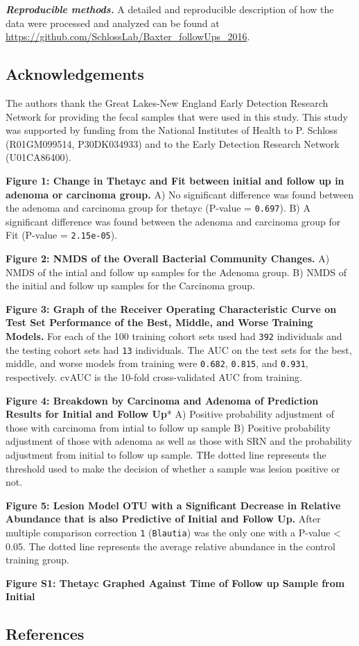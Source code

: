 \documentclass[12pt,]{article}
\begin{document}
\textbf{\emph{Reproducible methods.}} A detailed and reproducible
description of how the data were processed and analyzed can be found at
\url{https://github.com/SchlossLab/Baxter_followUps_2016}.

\newpage

\subsection{Acknowledgements}\label{acknowledgements}

The authors thank the Great Lakes-New England Early Detection Research
Network for providing the fecal samples that were used in this study.
This study was supported by funding from the National Institutes of
Health to P. Schloss (R01GM099514, P30DK034933) and to the Early
Detection Research Network (U01CA86400).

\newpage

\textbf{Figure 1: Change in Thetayc and Fit between initial and follow
up in adenoma or carcinoma group.} A) No significant difference was
found between the adenoma and carcinoma group for thetayc (P-value =
\texttt{0.697}). B) A significant difference was found between the
adenoma and carcinoma group for Fit (P-value = \texttt{2.15e-05}).

\textbf{Figure 2: NMDS of the Overall Bacterial Community Changes.} A)
NMDS of the intial and follow up samples for the Adenoma group. B) NMDS
of the initial and follow up samples for the Carcinoma group.

\textbf{Figure 3: Graph of the Receiver Operating Characteristic Curve
on Test Set Performance of the Best, Middle, and Worse Training Models.}
For each of the 100 training cohort sets used had \texttt{392}
individuals and the testing cohort sets had \texttt{13} individuals. The
AUC on the test sets for the best, middle, and worse models from
training were \texttt{0.682}, \texttt{0.815}, and \texttt{0.931},
respectively. cvAUC is the 10-fold cross-validated AUC from training.

\textbf{Figure 4: Breakdown by Carcinoma and Adenoma of Prediction
Results for Initial and Follow Up}* A) Positive probability adjustment
of those with carcinoma from intial to follow up sample B) Positive
probability adjustment of those with adenoma as well as those with SRN
and the probability adjustment from initial to follow up sample. THe
dotted line represents the threshold used to make the decision of
whether a sample was lesion positive or not.

\textbf{Figure 5: Lesion Model OTU with a Significant Decrease in
Relative Abundance that is also Predictive of Initial and Follow Up.}
After multiple comparison correction \texttt{1} (\texttt{Blautia}) was
the only one with a P-value \textless{} 0.05. The dotted line represents
the average relative abundance in the control training group.

\newpage

\textbf{Figure S1: Thetayc Graphed Against Time of Follow up Sample from
Initial}

\newpage

\subsection{References}\label{references}
\end{document}
